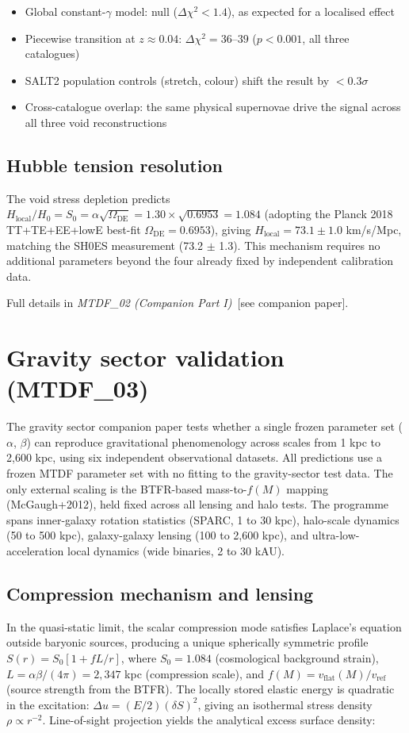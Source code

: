 \documentclass[11pt,a4paper]{article}
\begin{document}
\begin{itemize}
  \item Global constant-$\gamma$ model: null ($\Delta\chi^2 < 1.4$), as expected for a localised effect
  \item Piecewise transition at $z \approx 0.04$: $\Delta\chi^2 = 36$--$39$ ($p < 0.001$, all three catalogues)
  \item SALT2 population controls (stretch, colour) shift the result by $< 0.3\sigma$
  \item Cross-catalogue overlap: the same physical supernovae drive the signal across all three void reconstructions
\end{itemize}

\subsection{Hubble tension resolution}
The void stress depletion predicts $H_\text{local}/H_0 = S_0 = \alpha\sqrt{\Omega_\text{DE}} = 1.30 \times \sqrt{0.6953} = 1.084$ (adopting the Planck 2018 TT+TE+EE+lowE best-fit $\Omega_\text{DE} = 0.6953$), giving $H_\text{local} = 73.1 \pm 1.0$ km/\allowbreak{}s/\allowbreak{}Mpc, matching the SH0ES measurement (73.2 $\pm$ 1.3). This mechanism requires no additional parameters beyond the four already fixed by independent calibration data.

Full details in \textit{MTDF\_\allowbreak{}02 (Companion Part I)}~[see companion paper].

\section{Gravity sector validation (MTDF\_\allowbreak{}03)}
\label{sec:sec10}
The gravity sector companion paper tests whether a single frozen parameter set ($\alpha$, $\beta$) can reproduce gravitational phenomenology across scales from 1 kpc to 2,600 kpc, using six independent observational datasets. All predictions use a frozen MTDF parameter set with no fitting to the gravity-sector test data. The only external scaling is the BTFR-based mass-to-$f(M)$ mapping (McGaugh+2012), held fixed across all lensing and halo tests. The programme spans inner-galaxy rotation statistics (SPARC, 1 to 30 kpc), halo-scale dynamics (50 to 500 kpc), galaxy-galaxy lensing (100 to 2,600 kpc), and ultra-low-acceleration local dynamics (wide binaries, 2 to 30 kAU).

\subsection{Compression mechanism and lensing}
In the quasi-static limit, the scalar compression mode satisfies Laplace's equation outside baryonic sources, producing a unique spherically symmetric profile $S(r) = S_0[1 + fL/r]$, where $S_0 = 1.084$ (cosmological background strain), $L = \alpha\beta/(4\pi) = 2{,}347$ kpc (compression scale), and $f(M) = v_\text{flat}(M)/v_\text{ref}$ (source strength from the BTFR). The locally stored elastic energy is quadratic in the excitation: $\Delta u = (E/2)(\delta S)^2$, giving an isothermal stress density $\rho \propto r^{-2}$. Line-of-sight projection yields the analytical excess surface density:
\end{document}
